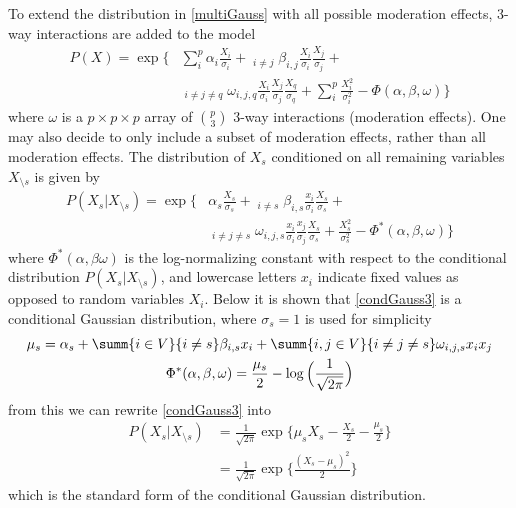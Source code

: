 To extend the distribution in \eqref{multiGauss} with all possible moderation effects, 3-way interactions are added to the model
\begin{equation} \label{multiGauss3}
    \begin{split}
        P(X) = \exp\Bigg\{&\sum_i^p \alpha_i \frac{X_i}{\sigma_i} + \mathop{\sum_{i,j \in V}}_{i \neq j} \beta_{i,j} \frac{X_i}{\sigma_i} \frac{X_j}{\sigma_j} + \\
        &\mathop{\sum_{i,j,q \in V}}_{i \neq j \neq q} \omega_{i,j,q} \frac{X_i}{\sigma_i} \frac{X_j}{\sigma_j} \frac{X_q}{\sigma_q} + \sum_i^p \frac{X_i^2}{\sigma_i^2} - \Phi(\alpha,\beta,\omega)\Bigg\}
    \end{split}
\end{equation}
where $\omega$ is a $p \times p \times p$ array of $\binom{p}{3}$ 3-way interactions (moderation effects). One may also decide to only include a subset of moderation effects, rather than all moderation effects. The distribution of $X_s$ conditioned on all remaining variables $X_{\setminus s}$ is given by
\begin{equation} \label{condGauss3}
    \begin{split}
        P(X_s|X_{\setminus s}) = \exp\Bigg\{&\alpha_s \frac{X_s}{\sigma_s} + \mathop{\sum_{i \in V}}_{i \neq s} \beta_{i,s} \frac{x_i}{\sigma_i} \frac{X_s}{\sigma_s} + \\
        &\mathop{\sum_{i,j \in V}}_{i \neq j \neq s} \omega_{i,j,s} \frac{x_i}{\sigma_i} \frac{x_j}{\sigma_j} \frac{X_s}{\sigma_s} + \frac{X_s^2}{\sigma_s^2} - \Phi^*(\alpha,\beta,\omega) \Bigg\}
    \end{split}
\end{equation}
where $\Phi^*(\alpha,\beta\omega)$ is the log-normalizing constant with respect to the conditional distribution $P(X_s|X_{\setminus s})$, and lowercase letters $x_i$ indicate fixed values as opposed to random variables $X_i$. Below it is shown that \eqref{condGauss3} is a conditional Gaussian distribution, where $\sigma_s = 1$ is used for simplicity
\begin{gather} \label{mu3}
    \mu_s = \alpha_s + \summ{i \in V}{i \neq s} \beta_{i,s} x_i + \summ{i,j \in V}{i \neq j \neq s} \omega_{i,j,s} x_i x_j \\
    \Phi^*(\alpha,\beta,\omega) = \frac{\mu_s}{2} - \log \Big(\frac{1}{\sqrt{2\pi}}\Big)
\end{gather}
from this we can rewrite \eqref{condGauss3} into
\begin{equation}
    \begin{split}
        P(X_s|X_{\setminus s}) &= \frac{1}{\sqrt{2\pi}} \exp\Bigg\{\mu_s X_s - \frac{X_s}{2} - \frac{\mu_s}{2}\Bigg\} \\
        &= \frac{1}{\sqrt{2\pi}} \exp\Bigg\{\frac{(X_s - \mu_s)^2}{2}\Bigg\}
    \end{split}
\end{equation}
which is the standard form of the conditional Gaussian distribution.

